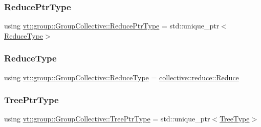 \mbox{\label{structvt_1_1group_1_1_group_collective_a01cba346d413026bc58941d18fd404e6}} 
\subsubsection{\texorpdfstring{Reduce\+Ptr\+Type}{ReducePtrType}}
{\footnotesize\ttfamily using \hyperlink{structvt_1_1group_1_1_group_collective_a01cba346d413026bc58941d18fd404e6}{vt\+::group\+::\+Group\+Collective\+::\+Reduce\+Ptr\+Type} =  std\+::unique\+\_\+ptr$<$\hyperlink{structvt_1_1group_1_1_group_collective_acc03682a21dc3e4293720c0f6677c88d}{Reduce\+Type}$>$}

\mbox{\label{structvt_1_1group_1_1_group_collective_acc03682a21dc3e4293720c0f6677c88d}} 
\subsubsection{\texorpdfstring{Reduce\+Type}{ReduceType}}
{\footnotesize\ttfamily using \hyperlink{structvt_1_1group_1_1_group_collective_acc03682a21dc3e4293720c0f6677c88d}{vt\+::group\+::\+Group\+Collective\+::\+Reduce\+Type} =  \hyperlink{structvt_1_1collective_1_1reduce_1_1_reduce}{collective\+::reduce\+::\+Reduce}}

\mbox{\label{structvt_1_1group_1_1_group_collective_a2e02dc375f193620af9832f187029188}} 
\subsubsection{\texorpdfstring{Tree\+Ptr\+Type}{TreePtrType}}
{\footnotesize\ttfamily using \hyperlink{structvt_1_1group_1_1_group_collective_a2e02dc375f193620af9832f187029188}{vt\+::group\+::\+Group\+Collective\+::\+Tree\+Ptr\+Type} =  std\+::unique\+\_\+ptr$<$\hyperlink{structvt_1_1group_1_1_group_collective_abae59cc0eb4512145a039fb47fff6a25}{Tree\+Type}$>$}

